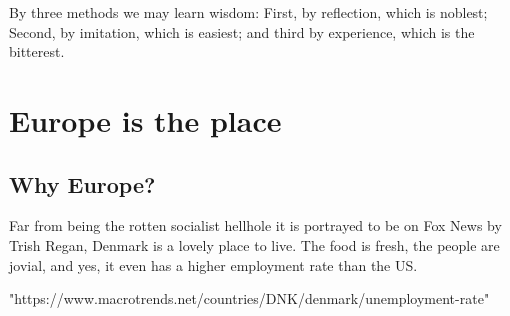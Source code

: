 \begin{savequote}[75mm]
By three methods we may learn wisdom: First, by reflection, which is noblest; Second, by imitation, which is easiest; and third by experience, which is the bitterest.
\end{savequote}
    
\chapter{Europe is the place}
    
\section{Why Europe?}
    
Far from being the rotten socialist hellhole it is portrayed to be on Fox News by Trish Regan, Denmark is a lovely place to live. The food is fresh, the people are jovial, and yes, it even has a higher employment rate than the US. 

"https://www.macrotrends.net/countries/DNK/denmark/unemployment-rate"